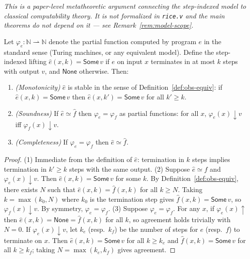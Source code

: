 \documentclass{lmcs}
\begin{document}
\begin{prop}
\label{rem:step-indexed}
\emph{This is a paper-level metatheoretic argument connecting the
step-indexed model to classical computability theory. It is not
formalized in \texttt{rice.v} and the main theorems do not depend on
it --- see Remark~\ref{rem:model-scope}.}\smallskip

Let $\varphi_e : \mathbb{N} \rightharpoonup \mathbb{N}$ denote the partial
function computed by program $e$ in the standard sense (Turing machines,
or any equivalent model). Define the step-indexed lifting
$\hat{e}(x, k) = \mathsf{Some}\,v$ if $e$ on input $x$ terminates in
at most $k$ steps with output $v$, and $\mathsf{None}$ otherwise.
Then:
\begin{enumerate}
  \item \emph{(Monotonicity)} $\hat{e}$ is stable in the sense of
        Definition~\ref{def:obs-equiv}: if $\hat{e}(x,k) = \mathsf{Some}\,v$
        then $\hat{e}(x,k') = \mathsf{Some}\,v$ for all $k' \geq k$.
  \item \emph{(Soundness)} If $\hat{e} \simeq \hat{f}$ then
        $\varphi_e = \varphi_f$ as partial functions: for all $x$,
        $\varphi_e(x)\downarrow v$ iff $\varphi_f(x)\downarrow v$.
  \item \emph{(Completeness)} If $\varphi_e = \varphi_f$ then
        $\hat{e} \simeq \hat{f}$.
\end{enumerate}
\end{prop}
\begin{proof}
(1) Immediate from the definition of $\hat{e}$: termination in $k$ steps
implies termination in $k'\geq k$ steps with the same output.
(2) Suppose $\hat{e} \simeq \hat{f}$ and $\varphi_e(x)\downarrow v$.
Then $\hat{e}(x,k) = \mathsf{Some}\,v$ for some $k$. By
Definition~\ref{def:obs-equiv}, there exists $N$ such that
$\hat{e}(x,k) = \hat{f}(x,k)$ for all $k \geq N$. Taking
$k = \max(k_0, N)$ where $k_0$ is the termination step gives
$\hat{f}(x,k) = \mathsf{Some}\,v$, so $\varphi_f(x)\downarrow v$.
By symmetry, $\varphi_e = \varphi_f$.
(3) Suppose $\varphi_e = \varphi_f$. For any $x$, if $\varphi_e(x)\uparrow$
then $\hat{e}(x,k) = \mathsf{None} = \hat{f}(x,k)$ for all $k$, so
agreement holds trivially with $N=0$. If $\varphi_e(x)\downarrow v$,
let $k_e$ (resp.\ $k_f$) be the number of steps for $e$ (resp.\ $f$)
to terminate on $x$. Then $\hat{e}(x,k) = \mathsf{Some}\,v$ for all
$k \geq k_e$ and $\hat{f}(x,k) = \mathsf{Some}\,v$ for all $k \geq k_f$;
taking $N = \max(k_e, k_f)$ gives agreement.
\end{proof}
\end{document}

